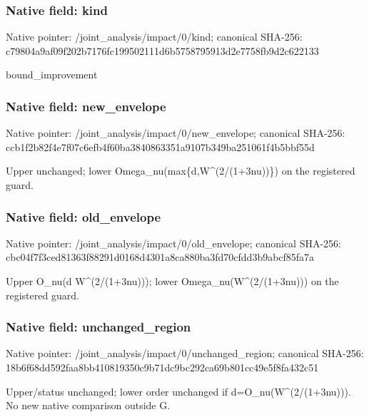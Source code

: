 \documentclass[10pt,a4paper]{article}
\begin{document}
\subsubsection{Native field: kind}
Native pointer: /joint\_\allowbreak{}analysis/impact/0/kind; canonical SHA-256: c79804a9af09f202b7176fc199502111d6b5758795913d2e7758fb9d2c622133

\begingroup\raggedright\sloppy bound\_\allowbreak{}improvement\par\endgroup

\subsubsection{Native field: new\_\allowbreak{}envelope}
Native pointer: /joint\_\allowbreak{}analysis/impact/0/new\_\allowbreak{}envelope; canonical SHA-256: ccb1f2b82f4e7f07c6efb4f60ba3840863351a9107b349ba251061f4b5bbf55d

\begingroup\raggedright\sloppy Upper unchanged;\allowbreak{} lower Omega\_\allowbreak{}nu(max\{d,\allowbreak{}W\textasciicircum{}(2/\allowbreak{}(1+3nu))\}) on the registered guard.\par\endgroup

\subsubsection{Native field: old\_\allowbreak{}envelope}
Native pointer: /joint\_\allowbreak{}analysis/impact/0/old\_\allowbreak{}envelope; canonical SHA-256: cbc04f7f3ced81363f88291d0168d4301a8ca880ba3fd70cfdd3b9abcf85fa7a

\begingroup\raggedright\sloppy Upper O\_\allowbreak{}nu(d W\textasciicircum{}(2/\allowbreak{}(1+3nu)));\allowbreak{} lower Omega\_\allowbreak{}nu(W\textasciicircum{}(2/\allowbreak{}(1+3nu))) on the registered guard.\par\endgroup

\subsubsection{Native field: unchanged\_\allowbreak{}region}
Native pointer: /joint\_\allowbreak{}analysis/impact/0/unchanged\_\allowbreak{}region; canonical SHA-256: 18b6f68dd592faa8bb410819350c9b71dc9bc292ca69b801cc49e5f8fa432c51

\begingroup\raggedright\sloppy Upper/\allowbreak{}status unchanged;\allowbreak{} lower order unchanged if d=\allowbreak{}O\_\allowbreak{}nu(W\textasciicircum{}(2/\allowbreak{}(1+3nu))). No new native comparison outside G.\par\endgroup
\end{document}
